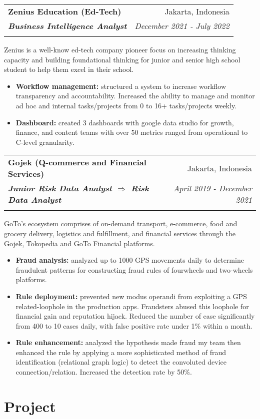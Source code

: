 \documentclass[a4paper, 11pt]{article}
\makeatletter
\newcommand{\resumeItem}[2]{
    \item\small{
        \textbf{#1}{#2 \vspace{-2pt}}
    }
}
\newcommand{\resumeSubheading}[4]{
    \vspace{-1pt}
    \begin{tabular*}{\textwidth}{l@{\extracolsep{\fill}}r}
        \color{lightblue}\textbf{#1} & #2 \\
        \textbf{\textit{\small#3}} & \textit{\small #4} \\
        \textnormal{}\vspace{-5pt}
    \end{tabular*}\vspace{-5pt}
}
\newcommand{\resumeItemListStart}{\begin{itemize}[leftmargin=*]\setlength\itemsep{0em}\vspace{-1pt}}
\newcommand{\resumeItemListEnd}{\end{itemize}\vspace{-5pt}}
\makeatother
\begin{document}
    \vspace{5pt}
    \resumeSubheading
    {Zenius Education (Ed-Tech)}
    {Jakarta, Indonesia}
    {Business Intelligence Analyst}
    {December 2021 - July 2022}
    {Zenius is a well-know ed-tech company pioneer focus on increasing thinking 
    capacity and building foundational thinking for junior and senior high school 
    student to help them excel in their school.}
    \vspace{-5pt}
    \resumeItemListStart
    \resumeItem{Workflow management:}{ structured a system to increase 
    workflow transparency and accountability. Increased the ability to manage 
    and monitor ad hoc and internal tasks/projects from 0 to 
    16+ tasks/projects weekly.}
    \resumeItem{Dashboard:}{ created 3 dashboards with google data studio for growth,
    finance, and content teams with over 50 metrics ranged from operational to
    C-level granularity.}
    \resumeItemListEnd

    \vspace{5pt}
    \resumeSubheading
    {Gojek (Q-commerce and Financial Services)}
    {Jakarta, Indonesia}
    {Junior Risk Data Analyst $\Rightarrow$ Risk Data Analyst}
    {April 2019 - December 2021}
    {GoTo’s ecosystem comprises of on-demand transport, e-commerce, food and grocery 
    delivery, logistics and fulfillment, and financial services through the Gojek, 
    Tokopedia and GoTo Financial platforms.}
    \vspace{-5pt}
    \resumeItemListStart
    \resumeItem{Fraud analysis:}{ analyzed up to 1000 GPS movements
    daily to determine fraudulent patterns for constructing fraud 
    rules of fourwheels and two-wheels platforms.}
    \resumeItem{Rule deployment:}{ prevented new modus operandi from exploiting a GPS 
    related-loophole in the production apps. Fraudsters abused this loophole for 
    financial gain and reputation hijack. Reduced the number of
    case significantly from 400 to 10 cases daily, with false positive rate under 1\%
    within a month.}
    \resumeItem{Rule enhancement:}{ analyzed the hypothesis made fraud my 
    team then enhanced the rule by applying a more sophisticated method of fraud 
    identification (relational graph logic) to detect the convoluted device 
    connection/relation. Increased the detection rate by 50\%.}
    \resumeItemListEnd

    \vspace{-5pt}
    \section{Project}
\end{document}
